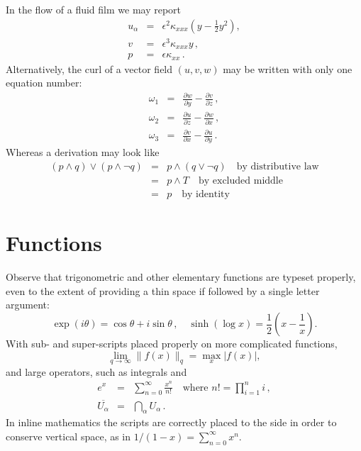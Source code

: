 \documentclass[a4paper]{article}
\begin{document}
    In the flow of a fluid film we may report
    \begin{eqnarray}
        u_\alpha & = & \epsilon^2 \kappa_{xxx} 
        \left( y-\frac{1}{2}y^2 \right),
        \label{equ}  \\
        v & = & \epsilon^3 \kappa_{xxx} y\,,
        \label{eqv}  \\
        p & = & \epsilon \kappa_{xx}\,.
        \label{eqp}
    \end{eqnarray}
    Alternatively, the curl of a vector field $(u,v,w)$ may be written 
    with only one equation number:
    \begin{eqnarray}
        \omega_1 & = &
        \frac{\partial w}{\partial y}-\frac{\partial v}{\partial z}\,,
        \nonumber  \\
        \omega_2 & = & 
        \frac{\partial u}{\partial z}-\frac{\partial w}{\partial x}\,,
        \label{eqcurl}  \\
        \omega_3 & = & 
        \frac{\partial v}{\partial x}-\frac{\partial u}{\partial y}\,.
        \nonumber
    \end{eqnarray}
    Whereas a derivation may look like
    \begin{eqnarray*}
        (p\wedge q)\vee(p\wedge\neg q) & = & p\wedge(q\vee\neg q)
        \quad\text{by distributive law}  \\
         & = & p\wedge T \quad\text{by excluded middle}  \\
         & = & p \quad\text{by identity}
    \end{eqnarray*}
    
    
    
    
    
    
    \section{Functions}
    
    Observe that trigonometric and other elementary functions are typeset 
    properly, even to the extent of providing a thin space if followed by 
    a single letter argument:
    \[
        \exp(i\theta)=\cos\theta +i\sin\theta\,,\quad
        \sinh(\log x)=\frac{1}{2}\left( x-\frac{1}{x} \right).
    \]
    With sub- and super-scripts placed properly on more complicated 
    functions,
    \[
        \lim_{q\to\infty}\|f(x)\|_q 
        =\max_{x}|f(x)|,
    \]
    and large operators, such as integrals and
    \begin{eqnarray*}
        e^x & = & \sum_{n=0}^\infty \frac{x^n}{n!}
        \quad\text{where }n!=\prod_{i=1}^n i\,,  \\
        \overline{U_\alpha} & = & \bigcap_\alpha U_\alpha\,.
    \end{eqnarray*}
    In inline mathematics the scripts are correctly placed to the side in 
    order to conserve vertical space, as in
    \(
        1/(1-x)=\sum_{n=0}^\infty x^n.
    \)
    
\end{document}
